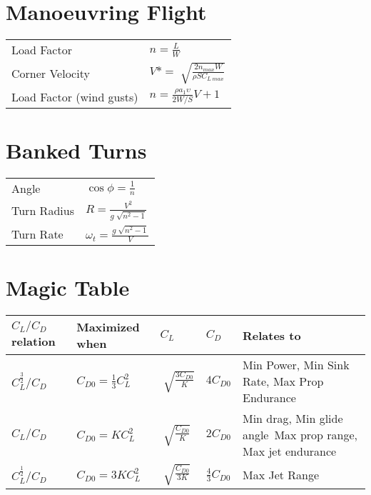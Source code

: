 \documentclass[a4paper,9pt]{extarticle}
\begin{document}
\begin{multicols*}{2}
\section{Manoeuvring Flight}
\begin{tabular}{ll}
Load Factor & $n=\frac{L}{W}$\\
Corner Velocity & $V*=\sqrt[]{\frac{2n_{max}W}{\rho S C_{L \ max}}}$\\
Load Factor (wind gusts) & $n=\frac{\rho a_1 \upsilon}{2W/S}V+1$
\end{tabular}

\section{Banked Turns}
\begin{tabular}{ll}
Angle & $\cos \phi = \frac{1}{n}$\\
Turn Radius & $R=\frac{V^2}{g\sqrt[]{n^2-1}}$\\
Turn Rate & $\omega_t=\frac{g\sqrt[]{n^2-1}}{V}$
\end{tabular}

\section{Magic Table}
\begin{table}[H]
\centering
\label{my-label}
\begin{tabular}{@{}lllll@{}}
\toprule
$C_L/C_D$ relation & Maximized when & $C_L$ & $C_D$ & Relates to  \\ \midrule
$C_L^{\frac{3}{2}}/C_D$ &$C_{D0}=\frac{1}{3}C_L^2$ &$\sqrt[]{\frac{3C_{D0}}{K}}$ & $4C_{D0}$   & Min Power, Min Sink Rate, Max Prop Endurance  \\
$C_L/C_D$ & $C_{D0}=KC_L^2$ &$\sqrt[]{\frac{C_{D0}}{K}}$ & $2C_{D0}$   & Min drag, Min glide angle\, Max prop range, Max jet endurance \\
$C_L^{\frac{1}{2}}/C_D$ & $C_{D0}=3KC_L^2$ & $\sqrt[]{\frac{C_{D0}}{3K}}$  & $\frac{4}{3}C_{D0}$ & Max Jet Range \\ \bottomrule
\end{tabular}
\end{table}

\end{multicols*}
\end{document}

